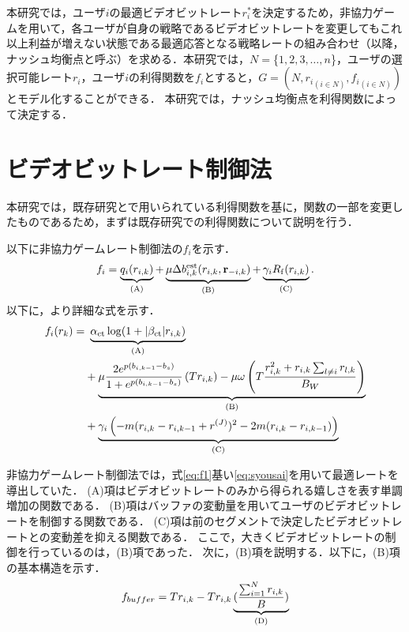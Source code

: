 本研究では，ユーザ$i$の最適ビデオビットレート$r_i^*$を決定するため，非協力ゲームを用いて，各ユーザが自身の戦略であるビデオビットレートを変更してもこれ以上利益が増えない状態である最適応答となる戦略レートの組み合わせ（以降，ナッシュ均衡点と呼ぶ）を求める．本研究では，$N=$\{$1,2,3,\dots,n$\}，ユーザの選択可能レート$r_i$，ユーザ$i$の利得関数を$f_i$とすると，$G=\left(N,{r_i}_{(i\in N)},{f_i}_{(i\in N)}\right)$とモデル化することができる．
本研究では，ナッシュ均衡点を利得関数によって決定する．

\section{ビデオビットレート制御法}

本研究では，既存研究\cite{kison}と\cite{motomoto}で用いられている利得関数を基に，関数の一部を変更したものであるため，まずは既存研究での利得関数\cite{kison}\cite{motomoto}について説明を行う．

以下に非協力ゲームレート制御法\cite{kison}の$f_i$を示す．
\begin{equation}
 f_{i}=\underbrace{q_{i}(r_{i,k})}_{(\rm{A})}+\underbrace{\mu\Delta{b^{\rm{est}}_{i,k}}(r_{i,k},\mathbf{r}_{-i,k})}_{(\rm{B})}+\underbrace{\gamma_i{R}_{\rm{f}}(r_{i,k})}_{(\rm{C})}.
 \label{eq:f1}
\end{equation}
以下に，より詳細な式を示す．
\begin{equation}
\begin{split}
  f_i(r_k) = &\ \underbrace{\alpha_{\text{ct}} \log(1 + |\beta_{\text{ct}}| r_{i,k})}_{(\rm{A})} \\
  &+ \underbrace{\mu \frac{2 e^{p(b_{i,k-1} - b_s)}}{1 + e^{p(b_{i,k-1} - b_s)}}\left(  T r_{i,k} \right) - \mu \omega  \left( T \frac{r_{i,k}^2 + r_{i,k} \sum_{l \neq i} r_{l,k}}{B_W} \right)}_{(\rm{B})} \\
  &+ \underbrace{\gamma_i \left( -m(r_{i,k} - r_{i,k-1} + r^{(J)})^2 - 2m(r_{i,k} - r_{i,k-1}) \right)}_{(\rm{C})}
  \label{eq:syousai}
\end{split}
\end{equation}



非協力ゲームレート制御法\cite{kison}では，式\eqref{eq:f1}基い\eqref{eq:syousai}を用いて最適レートを導出していた．
(A)項はビデオビットレートのみから得られる嬉しさを表す単調増加の関数である．
(B)項はバッファの変動量を用いてユーザのビデオビットレートを制御する関数である．
(C)項は前のセグメントで決定したビデオビットレートとの変動差を抑える関数である．
ここで，大きくビデオビットレートの制御を行っているのは，(B)項であった．
次に，(B)項を説明する．以下に，(B)項の基本構造を示す．
\begin{equation}
 f_{buffer}=Tr_{i,k}-Tr_{i,k}\underbrace{(\frac{\sum^N_{i=1}r_{i,k}}{B})}_{\rm{(D)}}
 \label{eq:f_{buffer}}
\end{equation}

